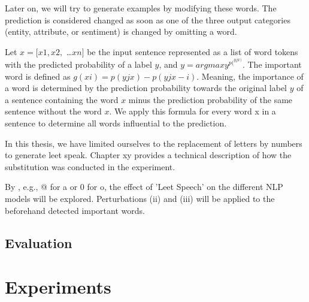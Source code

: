 Later on, we will try to generate examples by modifying these words.
The prediction is considered changed as soon as one of the three output categories (entity, attribute, or sentiment) is changed by omitting a word.

Let ${x = [x1, x2,}$ \dots${xn]}$ be the input sentence represented as a list of word tokens with the predicted probability of a label $y$, and ${y = argmaxy}^{p(}^{yjx)}$. The important word is defined as ${g(xi) = p(yjx) - p(yjx−i)}$.
Meaning, the importance of a word is determined by the prediction probability towards the original label $y$ of a sentence containing the word $x$ minus the prediction probability of the same sentence without the word $x$.
We apply this formula for every word x in a sentence to determine all words influential to the prediction. 

In this thesis, we have limited ourselves to the replacement of letters by numbers to generate leet speak. Chapter xy provides a technical description of how the substitution was conducted in the experiment.

By , e.g., @ for a or 0 for o, the effect of 'Leet Speech' on the different NLP models will be explored.
Perturbations (ii) and (iii) will be applied to the beforehand detected important words.


\subsection{Evaluation} 




\section{Experiments}


